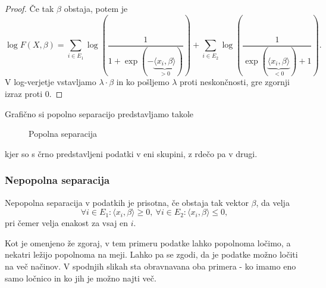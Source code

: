 \documentclass[12pt,a4paper]{amsart}
\theoremstyle{definition} %
\theoremstyle{plain} %
\begin{document}
\begin{proof}
    Če tak $\beta$ obstaja, potem je
    \[
    \log F(X,\beta) = \sum_{i\in E_{1}} \log\left(\frac{1}{1+\exp(-\underbrace{\langle x_{i},\beta \rangle}_{>0})}\right) + \sum_{i\in E_{2}}\log\left(\frac{1}{\exp(\underbrace{\langle x_{i},\beta \rangle}_{<0}) + 1}\right).
    \]
    V log-verjetje vstavljamo $\lambda \cdot \beta$ in ko pošljemo $\lambda$ proti neskončnosti, gre zgornji izraz proti 0.
\end{proof}

Grafično si popolno separacijo predstavljamo takole
\begin{center}
    \begin{figure}[h!]
    \caption{Popolna separacija}
\end{figure}
\end{center}
kjer so s črno predstavljeni podatki v eni skupini, z rdečo pa v drugi.

\subsubsection{Nepopolna separacija}
Nepopolna separacija v podatkih je prisotna, če obstaja tak vektor $\beta$, da velja
\begin{equation}\label{nepopolnaSep}
    \forall i \in E_{1}: \langle x_{i},\beta \rangle \geq 0,~\forall i\in E_{2}: \langle x_{i},\beta \rangle \leq 0,
\end{equation}
pri čemer velja enakost za vsaj en $i$.

Kot je omenjeno že zgoraj, v tem primeru podatke lahko popolnoma ločimo, a nekatri ležijo popolnoma na meji. Lahko pa se zgodi, da je podatke možno ločiti na več načinov. V spodnjih
slikah sta obravnavana oba primera - ko imamo eno samo ločnico in ko jih je možno najti več.
\end{document}
